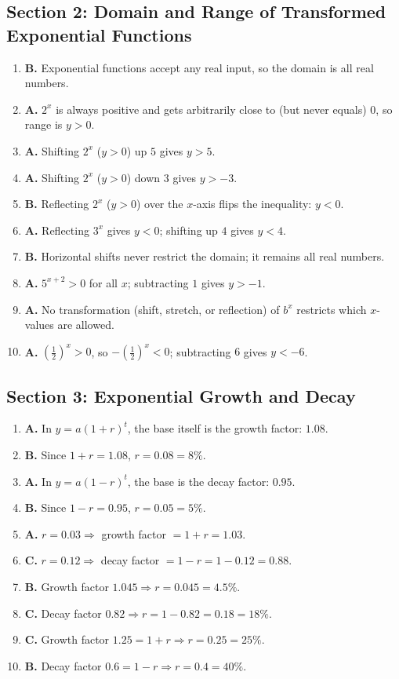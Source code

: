 \documentclass[11pt]{article}
\begin{document}
\subsection*{Section 2: Domain and Range of Transformed Exponential Functions}
\begin{enumerate}[leftmargin=1.5em, itemsep=6pt]
  \item \textbf{B.} Exponential functions accept any real input, so the domain is all real numbers.
  \item \textbf{A.} $2^x$ is always positive and gets arbitrarily close to (but never equals) $0$, so range is $y>0$.
  \item \textbf{A.} Shifting $2^x$ ($y>0$) up $5$ gives $y>5$.
  \item \textbf{A.} Shifting $2^x$ ($y>0$) down $3$ gives $y>-3$.
  \item \textbf{B.} Reflecting $2^x$ ($y>0$) over the $x$-axis flips the inequality: $y<0$.
  \item \textbf{A.} Reflecting $3^x$ gives $y<0$; shifting up $4$ gives $y<4$.
  \item \textbf{B.} Horizontal shifts never restrict the domain; it remains all real numbers.
  \item \textbf{A.} $5^{x+2}>0$ for all $x$; subtracting $1$ gives $y>-1$.
  \item \textbf{A.} No transformation (shift, stretch, or reflection) of $b^x$ restricts which $x$-values are allowed.
  \item \textbf{A.} $\left(\tfrac12\right)^x>0$, so $-\left(\tfrac12\right)^x<0$; subtracting $6$ gives $y<-6$.
\end{enumerate}

\subsection*{Section 3: Exponential Growth and Decay}
\begin{enumerate}[leftmargin=1.5em, itemsep=6pt]
  \item \textbf{A.} In $y=a(1+r)^t$, the base itself is the growth factor: $1.08$.
  \item \textbf{B.} Since $1+r=1.08$, $r=0.08=8\%$.
  \item \textbf{A.} In $y=a(1-r)^t$, the base is the decay factor: $0.95$.
  \item \textbf{B.} Since $1-r=0.95$, $r=0.05=5\%$.
  \item \textbf{A.} $r=0.03 \Rightarrow$ growth factor $=1+r=1.03$.
  \item \textbf{C.} $r=0.12 \Rightarrow$ decay factor $=1-r=1-0.12=0.88$.
  \item \textbf{B.} Growth factor $1.045 \Rightarrow r = 0.045 = 4.5\%$.
  \item \textbf{C.} Decay factor $0.82 \Rightarrow r = 1-0.82 = 0.18 = 18\%$.
  \item \textbf{C.} Growth factor $1.25 = 1+r \Rightarrow r=0.25=25\%$.
  \item \textbf{B.} Decay factor $0.6 = 1-r \Rightarrow r=0.4=40\%$.
\end{enumerate}
\end{document}
